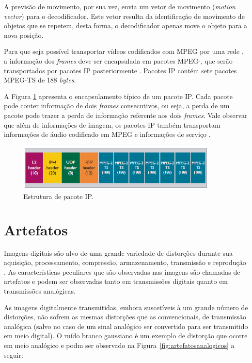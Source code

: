 A previsão de movimento, por sua vez, envia um vetor de movimento (\emph{motion vector}) para o decodificador. Este vetor resulta da identificação de movimento de objetos que se repetem, desta forma, o decodificador apenas move o objeto para a nova posição.

Para que seja possível transportar vídeos codificados com MPEG por uma rede , a informação dos \emph{frames} deve ser encapsulada em pacotes MPEG-, que serão transportados por pacotes IP posteriormente \cite{ciscoieee}. Pacotes IP contém sete pacotes MPEG-TS de 188 \emph{bytes}. 

A Figura \ref{fig:ts} apresenta o encapsulamento típico de um pacote IP. Cada pacote pode conter informação de dois \emph{frames} consecutivos, ou seja, a perda de um pacote pode trazer a perda de informação referente aos dois \emph{frames}. Vale observar que além de informações de imagem, os pacotes IP também transportam informações de áudio codificado em MPEG e informações de serviço \cite{ciscoieee}.

\begin{figure}[!htb]
	\centering
	\includegraphics[width=0.9\textwidth]{./imgs/ts.png}
	\caption{Estrutura de pacote IP.}
	\label{fig:ts}
\end{figure}

\section{Artefatos}

Imagens digitais são alvo de uma grande variedade de distorções durante sua aquisição, processamento, compressão, armazenamento, transmissão e reprodução \cite{wangbovik2004}. As características peculiares que são observadas nas imagens são chamadas de artefatos \cite{albini} e podem ser observadas tanto em transmissões digitais quanto em transmissões analógicas.

As imagens digitalmente transmitidas, embora suscetíveis à um grande número de distorções, não sofrem as mesmas distorções que as convencionais, de transmissão analógica (salvo no caso de um sinal analógico ser convertido para ser transmitido em meio digital). O ruído branco gaussiano é um exemplo de distorção que ocorre em meio analógico e podm ser observado na Figura~\ref{fig:artefatosanalogicos} a seguir:

